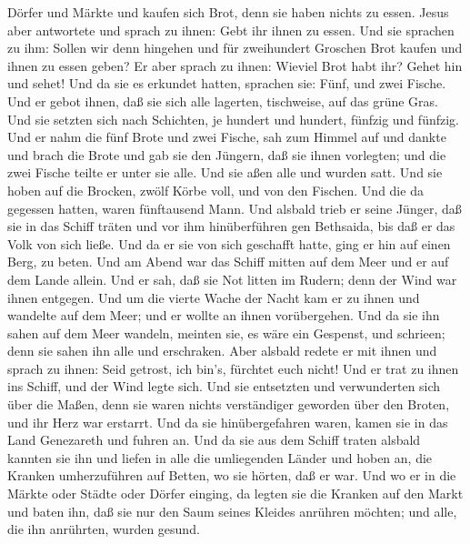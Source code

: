 Dörfer und Märkte und kaufen sich Brot, denn sie haben nichts zu essen.
 Jesus aber antwortete und sprach zu ihnen: Gebt ihr ihnen
zu essen. Und sie sprachen zu ihm: Sollen wir denn hingehen und für
zweihundert Groschen Brot kaufen und ihnen zu essen geben? 
Er aber sprach zu ihnen: Wieviel Brot habt ihr? Gehet hin und sehet! Und
da sie es erkundet hatten, sprachen sie: Fünf, und zwei Fische.
 Und er gebot ihnen, daß sie sich alle lagerten,
tischweise, auf das grüne Gras.  Und sie setzten sich nach
Schichten, je hundert und hundert, fünfzig und fünfzig. 
Und er nahm die fünf Brote und zwei Fische, sah zum Himmel auf und
dankte und brach die Brote und gab sie den Jüngern, daß sie ihnen
vorlegten; und die zwei Fische teilte er unter sie alle. 
Und sie aßen alle und wurden satt.  Und sie hoben auf die
Brocken, zwölf Körbe voll, und von den Fischen.  Und die da
gegessen hatten, waren fünftausend Mann.  Und alsbald trieb
er seine Jünger, daß sie in das Schiff träten und vor ihm hinüberführen
gen Bethsaida, bis daß er das Volk von sich ließe.  Und da
er sie von sich geschafft hatte, ging er hin auf einen Berg, zu beten.
 Und am Abend war das Schiff mitten auf dem Meer und er auf
dem Lande allein.  Und er sah, daß sie Not litten im
Rudern; denn der Wind war ihnen entgegen. Und um die vierte Wache der
Nacht kam er zu ihnen und wandelte auf dem Meer;  und er
wollte an ihnen vorübergehen. Und da sie ihn sahen auf dem Meer wandeln,
meinten sie, es wäre ein Gespenst, und schrieen;  denn sie
sahen ihn alle und erschraken. Aber alsbald redete er mit ihnen und
sprach zu ihnen: Seid getrost, ich bin's, fürchtet euch nicht!
 Und er trat zu ihnen ins Schiff, und der Wind legte sich.
Und sie entsetzten und verwunderten sich über die Maßen, 
denn sie waren nichts verständiger geworden über den Broten, und ihr
Herz war erstarrt.  Und da sie hinübergefahren waren, kamen
sie in das Land Genezareth und fuhren an.  Und da sie aus
dem Schiff traten alsbald kannten sie ihn  und liefen in
alle die umliegenden Länder und hoben an, die Kranken umherzuführen auf
Betten, wo sie hörten, daß er war.  Und wo er in die Märkte
oder Städte oder Dörfer einging, da legten sie die Kranken auf den Markt
und baten ihn, daß sie nur den Saum seines Kleides anrühren möchten; und
alle, die ihn anrührten, wurden gesund.

